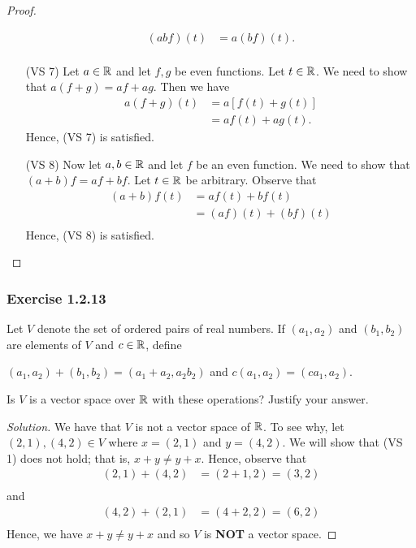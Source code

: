 \begin{proof}
\begin{enumerate}
\begin{align*}
                (ab  f)(t)  &= a (bf)(t).  \\
            \end{align*}
        \item[(VS 7)] Let \( a \in \mathbb{R}  \) and let \( f,g   \) be even functions. Let \( t \in \mathbb{R}  \). We need to show that \( a (f+g) = af + ag \). Then we have 
            \begin{align*}
                a(f+g)(t) &= a [ f(t) + g(t) ] \\
                          &= a f(t) + a g(t).
            \end{align*}
            Hence, (VS 7) is satisfied.
        \item[(VS 8)] Now let \( a,b \in \mathbb{R}  \) and let \( f  \) be an even function. We need to show that \(  (a+b) f =  a f + b f  \). Let \( t \in \mathbb{R}  \) be arbitrary.
            Observe that 
            \begin{align*}
                (a+b)f(t) &= a f(t) + b f(t)   \\
                          &=  (af)(t) + (bf)(t) \\
            \end{align*}
            Hence, (VS 8) is satisfied.
    \end{enumerate}
\end{proof}

\subsubsection{Exercise 1.2.13} Let \( V  \) denote the set of ordered pairs of real numbers. If \( (a_{1}, a_{2}) \) and \( (b_{1}, b_{2}) \) are elements of \( V  \) and \( c \in \mathbb{R}  \), define 
\begin{center}
    \( (a_{1}, a_{2} ) + (b_{1} , b_{2} ) = (a_{1} + a_{2} , a_{2} b_{2} ) \) and \( c (a_{1} , a_{2} ) = (ca_{1} , a_{2})  \).
\end{center}
Is \( V  \) is a vector space over \( \mathbb{R}  \) with these operations? Justify your answer.
\begin{proof}[Solution]
We have that \( V  \) is not a vector space of \( \mathbb{R}  \). To see why,  let \( (2,1), (4,2) \in V  \) where \( x = (2,1)  \) and \( y = (4,2) \). We will show that (VS 1) does not hold; that is, \( x + y \neq y + x  \). Hence, observe that 
\begin{align*}
    (2,1) + (4,2) &= (2 + 1, 2 ) = (3,2) \\
\end{align*}
and 
\begin{align*}
    (4,2) + (2,1) &= (4+2 , 2) =  (6, 2) \\
\end{align*}
Hence, we have \( x + y \neq y  + x   \) and so \( V  \) is \textbf{NOT} a vector space.
\end{proof}

